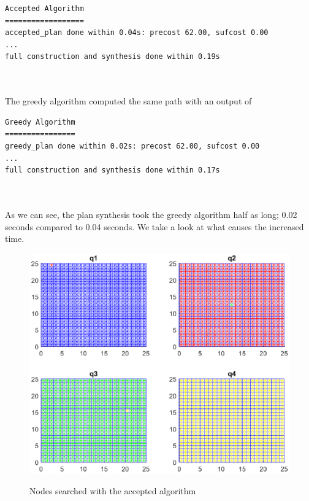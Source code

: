 \begin{minipage}{\textwidth}
\begingroup
\fontsize{9pt}{12pt}\selectfont
\begin{lstlisting}
Accepted Algorithm
==================
accepted_plan done within 0.04s: precost 62.00, sufcost 0.00
...
full construction and synthesis done within 0.19s 
\end{lstlisting}
\endgroup
\end{minipage} \\ \\


The greedy algorithm computed the same path with an output of \\


\begin{minipage}{\textwidth}
\begingroup
\fontsize{9pt}{12pt}\selectfont
\begin{lstlisting}
Greedy Algorithm
================
greedy_plan done within 0.02s: precost 62.00, sufcost 0.00
...
full construction and synthesis done within 0.17s 
\end{lstlisting}
\endgroup
\end{minipage} \\ \\


As we can see, the plan synthesis took the greedy algorithm half as long; 0.02 seconds compared to 0.04 seconds. We take a look at what causes the increased time. 

\begin{figure}[!htb]
\centering
\includegraphics[scale=0.7]{acceptedPlot}
\label{fig:animAccept}
\caption{Nodes searched with the accepted algorithm}
\end{figure}

